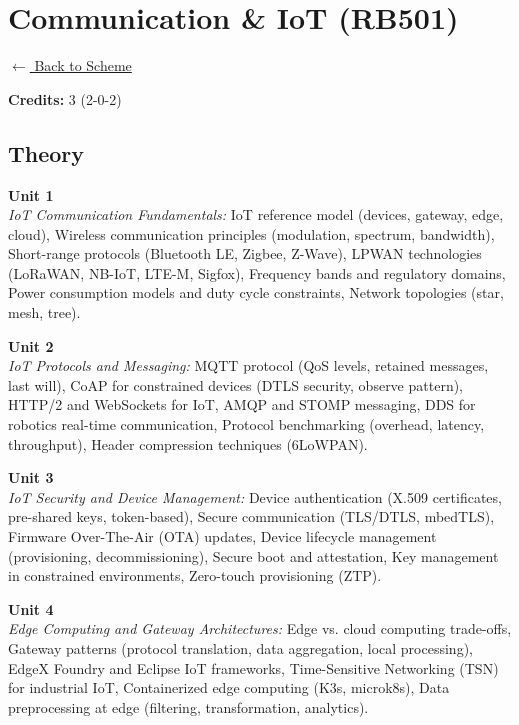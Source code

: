 \section*{Communication \& IoT (RB501)}
\label{major:RB_5}

\noindent \small{\hyperref[main:scheme]{$\leftarrow$ Back to Scheme}} \vspace{0.5cm}

\noindent \textbf{Credits:} 3 (2-0-2)

\subsection*{Theory}
\noindent\textbf{Unit 1} \\
\textit{IoT Communication Fundamentals:} IoT reference model (devices, gateway, edge, cloud), Wireless communication principles (modulation, spectrum, bandwidth), Short-range protocols (Bluetooth LE, Zigbee, Z-Wave), LPWAN technologies (LoRaWAN, NB-IoT, LTE-M, Sigfox), Frequency bands and regulatory domains, Power consumption models and duty cycle constraints, Network topologies (star, mesh, tree).

\vspace{0.3cm}

\noindent\textbf{Unit 2} \\
\textit{IoT Protocols and Messaging:} MQTT protocol (QoS levels, retained messages, last will), CoAP for constrained devices (DTLS security, observe pattern), HTTP/2 and WebSockets for IoT, AMQP and STOMP messaging, DDS for robotics real-time communication, Protocol benchmarking (overhead, latency, throughput), Header compression techniques (6LoWPAN).

\vspace{0.3cm}

\noindent\textbf{Unit 3} \\
\textit{IoT Security and Device Management:} Device authentication (X.509 certificates, pre-shared keys, token-based), Secure communication (TLS/DTLS, mbedTLS), Firmware Over-The-Air (OTA) updates, Device lifecycle management (provisioning, decommissioning), Secure boot and attestation, Key management in constrained environments, Zero-touch provisioning (ZTP).

\vspace{0.3cm}

\noindent\textbf{Unit 4} \\
\textit{Edge Computing and Gateway Architectures:} Edge vs. cloud computing trade-offs, Gateway patterns (protocol translation, data aggregation, local processing), EdgeX Foundry and Eclipse IoT frameworks, Time-Sensitive Networking (TSN) for industrial IoT, Containerized edge computing (K3s, microk8s), Data preprocessing at edge (filtering, transformation, analytics).

